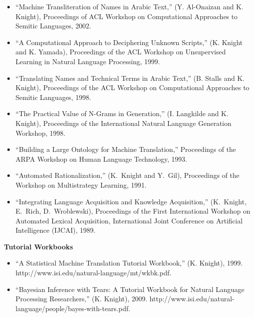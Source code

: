 \begin{itemize}
\item ``Machine Transliteration of Names in Arabic Text,'' (Y. Al-Onaizan and 
K. Knight), Proceedings of ACL Workshop on Computational Approaches to 
Semitic Languages, 2002.

\item ``A Computational Approach to Deciphering Unknown Scripts,''
(K. Knight and K. Yamada),
Proceedings of the ACL Workshop on Unsupervised Learning in Natural
Language Processing, 1999.

\item ``Translating Names and Technical Terms in Arabic Text,''
(B. Stalls and K. Knight),
Proceedings of the ACL Workshop on Computational Approaches 
to Semitic Languages, 1998.

\item ``The Practical Value of N-Grams in Generation,''
(I. Langkilde and K. Knight), 
Proceedings of the International Natural Language Generation Workshop, 1998.

\item ``Building a Large Ontology for Machine Translation,''
Proceedings of the ARPA Workshop on Human Language Technology, 1993.

\item ``Automated Rationalization,'' (K.~Knight and Y.~Gil),
Proceedings of the Workshop on Multistrategy Learning, 1991.

\item ``Integrating Language Acquisition and Knowledge Acquisition,''
(K.~Knight, E.~Rich, D.~Wroblewski), Proceedings of
the First International Workshop on Automated Lexical Acquisition, 
International Joint Conference on Artificial Intelligence (IJCAI), 1989.
\end{itemize}

\noindent
{\bf Tutorial Workbooks}

\begin{itemize}

\item ``A Statistical Machine Translation Tutorial 
Workbook,'' (K. Knight), 1999.  
http://www.isi.edu/natural-language/mt/wkbk.pdf.

\item ``Bayesian Inference with Tears: A Tutorial Workbook for
Natural Language Processing Researchers,'' (K. Knight), 2009.
http://www.isi.edu/natural-language/people/bayes-with-tears.pdf.

\end{itemize}



